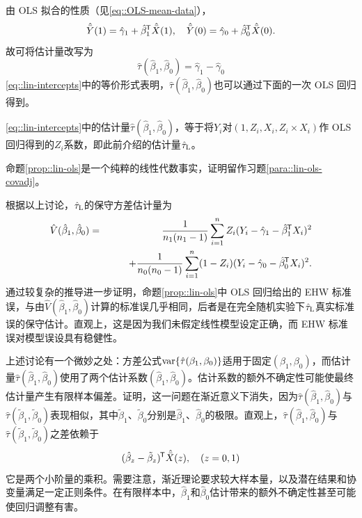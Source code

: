 由 OLS 拟合的性质（见\eqref{eq::OLS-mean-data}），
$$
\hat{\bar{Y}}(1) =  \hat{\gamma}_1 + \hat{\beta}_1^{\mkern-1.5mu\mathsf{T}}  \hat{\bar{X} }(1),\quad
\hat{\bar{Y}}(0) =  \hat{\gamma}_0 + \hat{\beta}_0^{\mkern-1.5mu\mathsf{T}}  \hat{\bar{X} }(0).
$$
故可将估计量改写为
\begin{equation}
\label{eq::lin-intercepts}
 \hat{\tau}( \hat{\beta}_1, \hat{\beta}_0)  =  \hat{\gamma}_1 - \hat{\gamma}_0  
\end{equation}
\eqref{eq::lin-intercepts}中的等价形式表明，$ \hat{\tau}( \hat{\beta}_1, \hat{\beta}_0) $也可以通过下面的一次 OLS 回归得到。




\begin{proposition}\label{prop::lin-ols}
\eqref{eq::lin-intercepts}中的估计量$ \hat{\tau}( \hat{\beta}_1, \hat{\beta}_0) $，等于将$Y_i$对$(1, Z_i, X_i, Z_i\times X_i)$作 OLS 回归得到的$Z_i$系数，即此前介绍的\citet{lin2013}估计量$\hat{\tau}_\textsc{L}$。 
\end{proposition}

命题\ref{prop::lin-ols}是一个纯粹的线性代数事实，证明留作习题\ref{para::lin-ols-covadj}。 


根据以上讨论，$\hat{\tau}_\textsc{L}$的保守方差估计量为
\begin{eqnarray*}
\hat{V}(  \hat{\beta}_1, \hat{\beta}_0 ) 
&=& \frac{1}{n_1(n_1 - 1)} \sum_{i=1}^n Z_i  ( Y_i - \hat{\gamma}_1 - \hat{\beta}_1^{\mkern-1.5mu\mathsf{T}}  X_i  ) ^2 \\
&& \qquad + \frac{1}{n_0(n_0 - 1)} \sum_{i=1}^n (1-Z_i)  ( Y_i - \hat{\gamma}_0 - \hat{\beta}_0^{\mkern-1.5mu\mathsf{T}}  X_i )^2.
\end{eqnarray*}
\citet{lin2013}通过较复杂的推导进一步证明，命题\ref{prop::lin-ols}中 OLS 回归给出的 EHW 标准误，与由$\hat{V}(  \hat{\beta}_1, \hat{\beta}_0 ) $计算的标准误几乎相同，后者是在完全随机实验下$\hat{\tau}_\textsc{L}$真实标准误的保守估计。直观上，这是因为我们未假定线性模型设定正确，而 EHW 标准误对模型误设具有稳健性。 



上述讨论有一个微妙之处：方差公式$\textup{var}\{ \hat{\tau}(\beta_1, \beta_0) \} $适用于固定$(\beta_1, \beta_0)$，而估计量$ \hat{\tau}( \hat{\beta}_1, \hat{\beta}_0) $使用了两个估计系数$( \hat{\beta}_1, \hat{\beta}_0) $。估计系数的额外不确定性可能使最终估计量产生有限样本偏差。\citet{lin2013}证明，这一问题在渐近意义下消失，因为$ \hat{\tau}( \hat{\beta}_1, \hat{\beta}_0) $与$ \hat{\tau}( \tilde{\beta}_1, \tilde{\beta}_0) $表现相似，其中$\tilde{\beta}_1$、$\tilde{\beta}_0$分别是$\hat{\beta}_1$、$ \hat{\beta}_0$的极限。直观上，$ \hat{\tau}( \hat{\beta}_1, \hat{\beta}_0) $与$ \hat{\tau}( \tilde{\beta}_1, \tilde{\beta}_0) $之差依赖于
$$
(\hat{\beta}_z - \tilde{\beta}_z)^{\mkern-1.5mu\mathsf{T}} \hat{\bar{X} }(z) ,\quad (z=0,1) 
$$
它是两个小阶量的乘积。需要注意，渐近理论要求较大样本量，以及潜在结果和协变量满足一定正则条件。在有限样本中，$\hat{\beta}_1$和$\hat{\beta}_0$估计带来的额外不确定性甚至可能使回归调整有害。 




